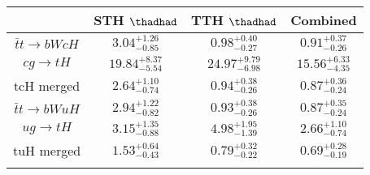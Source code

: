 \centering
\begin{tabular}{cccc} \toprule\toprule
 & STH $\thadhad$ & TTH $\thadhad$ & Combined\\\midrule
$\bar{t}t\to bWcH$ & $3.04^{+1.26}_{-0.85}$ & $0.98^{+0.40}_{-0.27}$ & $0.91^{+0.37}_{-0.26}$\\
$cg\to tH$ & $19.84^{+8.37}_{-5.54}$ & $24.97^{+9.79}_{-6.98}$ & $15.56^{+6.33}_{-4.35}$\\
tcH merged & $2.64^{+1.10}_{-0.74}$ & $0.94^{+0.38}_{-0.26}$ & $0.87^{+0.36}_{-0.24}$\\
$\bar{t}t\to bWuH$ & $2.94^{+1.22}_{-0.82}$ & $0.93^{+0.38}_{-0.26}$ & $0.87^{+0.35}_{-0.24}$\\
$ug\to tH$ & $3.15^{+1.35}_{-0.88}$ & $4.98^{+1.95}_{-1.39}$ & $2.66^{+1.10}_{-0.74}$\\
tuH merged & $1.53^{+0.64}_{-0.43}$ & $0.79^{+0.32}_{-0.22}$ & $0.69^{+0.28}_{-0.19}$\\
\bottomrule\bottomrule\\
\end{tabular}
